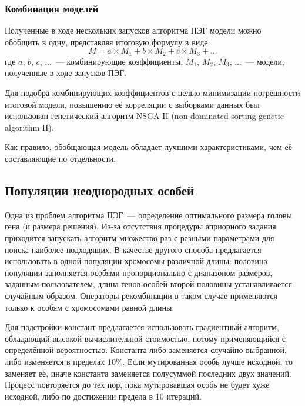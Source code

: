 
\subsubsection{Комбинация моделей}

Полученные в ходе нескольких запусков алгоритма ПЭГ модели можно~\cite{journals/jikm/AbrahamG06, guo2012novel} обобщить в одну, представляя итоговую формулу в виде:
\begin{equation}
\label{eq:ensembles}
M = a \times M_1 + b \times M_2 + c \times M_3 + \ldots
\end{equation}
где $a$, $b$, $c$, $\ldots$~--- комбинирующие коэффициенты, $M_1$, $M_2$, $M_3$, $\ldots$~--- модели, полученные в ходе запусков ПЭГ.

Для подобра комбинирующих коэффициентов с целью минимизации погрешности итоговой модели, повышению её корреляции с выборками данных был использован генетический алгоритм NSGA II (non-dominated sorting genetic algorithm II).

Как правило, обобщающая модель обладает лучшими характеристиками, чем её составляющие по отдельности.


\subsection{Популяции неоднородных особей}

Одна из проблем алгоритма ПЭГ~--- определение оптимального размера головы гена (и размера решения). Из-за отсутствия процедуры априорного задания приходится запускать алгоритм множество раз с разными параметрами для поиска наиболее подходящих. В качестве другого способа предлагается~\cite{Lopes:2004:AMCS} использовать в одной популяции хромосомы различной длины: половина популяции заполняется особями пропорционально с диапазоном размеров, заданным пользователем, длина генов особей второй половины устанавливается случайным образом. Операторы рекомбинации в таком случае применяются только к особям с хромосомами равной длины.

Для подстройки констант предлагается использовать градиентный алгоритм, обладающий высокой вычислительной стоимостью, потому применяющийся с определённой вероятностью. Константа либо заменяется случайно выбранной, либо изменяется в пределах 10\%. Если мутированная особь лучше исходной, то заменяет её, иначе константа заменяется полусуммой последних двух значений. Процесс повторяется до тех пор, пока мутировавшая особь не будет хуже исходной, либо по достижении предела в 10 итераций.

